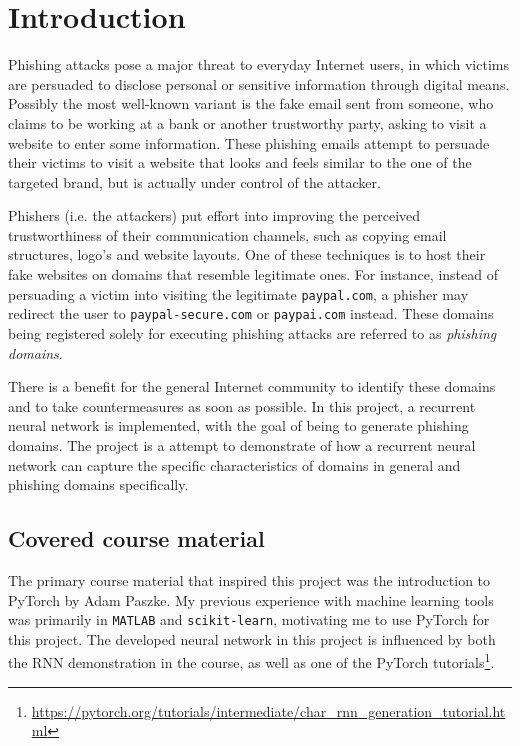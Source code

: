 \section{Introduction}
Phishing attacks pose a major threat to everyday Internet users, in which victims are persuaded to disclose personal or sensitive information through digital means.
Possibly the most well-known variant is the fake email sent from someone, who claims to be working at a bank or another trustworthy party, asking to visit a website to enter some information.
These phishing emails attempt to persuade their victims to visit a website that looks and feels similar to the one of the targeted brand, but is actually under control of the attacker.

Phishers (i.e. the attackers) put effort into improving the perceived trustworthiness of their communication channels, such as copying email structures, logo's and website layouts.
One of these techniques is to host their fake websites on domains that resemble legitimate ones.
For instance, instead of persuading a victim into visiting the legitimate {\tt paypal.com}, a phisher may redirect the user to {\tt paypal-secure.com} or {\tt paypai.com} instead.
These domains being registered solely for executing phishing attacks are referred to as {\it phishing domains}.

There is a benefit for the general Internet community to identify these domains and to take countermeasures as soon as possible.
In this project, a recurrent neural network is implemented, with the goal of being to generate phishing domains.
The project is a attempt to demonstrate of how a recurrent neural network can capture the specific characteristics of domains in general and phishing domains specifically. 

\subsection{Covered course material}
The primary course material that inspired this project was the introduction to PyTorch by Adam Paszke.
My previous experience with machine learning tools was primarily in {\tt MATLAB} and {\tt scikit-learn}, motivating me to use PyTorch for this project.
The developed neural network in this project is influenced by both the RNN demonstration in the course, as well as one of the PyTorch tutorials\footnote{\url{https://pytorch.org/tutorials/intermediate/char_rnn_generation_tutorial.html}}.